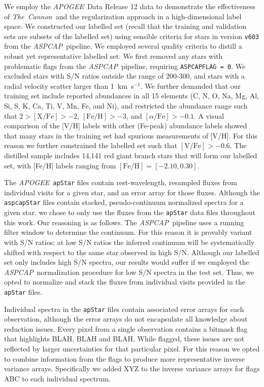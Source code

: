 \documentclass[12pt,preprint]{aastex}
\newcommand{\project}[1]{\textsl{#1}}
\newcommand{\TheCannon}{\project{The~Cannon}}
\newcommand{\acronym}[1]{{\small{#1}}}
\newcommand{\apogee}{\project{\acronym{APOGEE}}}
\newcommand{\aspcap}{\project{\acronym{ASPCAP}}}
\begin{document}
We employ the \apogee\ Data Release 12 data to demonstrate the effectiveness of
\TheCannon\ and the regularization approach in a high-dimensional label space.
We constructed our labelled set (recall that the training and validation sets 
are subsets of the labelled set) using sensible criteria for stars in version 
\texttt{v603} from the \aspcap\ pipeline.  We employed several quality criteria 
to distill a robust yet representative labelled set: We first removed any stars
with problematic flags from the \aspcap\ pipeline, requiring 
\texttt{ASPCAPFLAG = 0}.  We excluded stars with S/N ratios outside the range of
200-300, and stars with a radial velocity scatter larger than 1~km~s$^{-1}$.  We
further demanded that our training set include reported abundances in all 15 
elements (C, N, O, Na, Mg, Al, Si, S, K, Ca, Ti, V, Mn, Fe, and Ni), and 
restricted the abundance range such that $2 > \mathrm{[X/Fe]} > -2$, 
$\mathrm{[Fe/H]} > -3$, and $[\alpha/\mathrm{Fe}] > -0.1$.  A visual comparison 
of the [V/H] labels with other (Fe-peak) abundance labels showed that many stars
in the training set had spurious measurements of [V/H].  For this reason we 
further constrained the labelled set such that $\mathrm{[V/Fe]} > -0.6$.  The 
distilled sample includes 14,141 red giant branch stars that will form our 
labelled set, with [Fe/H] labels ranging from $\mathrm{[Fe/H]} = [-2.10, 0.30]$. 


The \apogee\ \texttt{apStar} files contain rest-wavelength, resampled fluxes 
from individual visits for a given star, and an error array for those fluxes.
Although the \texttt{aspcapStar} files contain stacked, pseudo-continuum 
normalized spectra for a given star, we chose to only use the fluxes from the 
\texttt{apStar} data files throughout this work.  Our reasoning is as follows. 
The \aspcap\ pipeline uses a running filter window to determine the continuum.  
For this reason it is provably variant with S/N ratios: at low S/N ratios the 
inferred continuum will be systematically shifted with respect to the same star 
observed in high S/N.  Although our labelled set only includes high S/N spectra,
our results would suffer if we employed the \aspcap\ normalization procedure for
low S/N spectra in the test set.  Thus, we opted to normalize and stack the
fluxes from individual visits provided in the \texttt{apStar} files.


Individual spectra in the \texttt{apStar} files contain associated error arrays
for each observation, although the error arrays do not encapsulate all knowledge
about reduction issues.  Every pixel from a single observation contains a bitmask
flag that highlights BLAH, BLAH and BLAH.  While flagged, these issues are not
reflected by larger uncertainties for that particular pixel.  For this reason we
opted to combine information from the flags to produce more representative
inverse variance arrays.  Specifically we added  XYZ to the inverse variance
arrays for flags ABC to each individual spectrum.  
\end{document}

